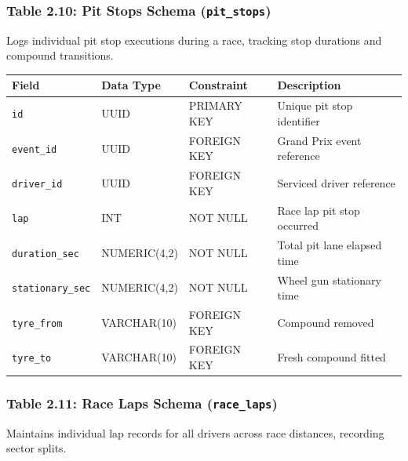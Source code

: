 \documentclass[12pt,a4paper]{report}
\begin{document}
\newpage
\subsubsection*{Table 2.10: Pit Stops Schema (\textnormal{\texttt{pit\_stops}})}
Logs individual pit stop executions during a race, tracking stop durations and compound transitions.

\begin{table}[H]
\centering
\small
\begin{tabularx}{\textwidth}{l p{2.6cm} p{2.6cm} X}
\toprule
\rowcolor{gray!15}
\textbf{Field} & \textbf{Data Type} & \textbf{Constraint} & \textbf{Description} \\
\midrule
\texttt{id} & UUID & PRIMARY KEY & Unique pit stop identifier \\
\texttt{event\_id} & UUID & FOREIGN KEY & Grand Prix event reference \\
\texttt{driver\_id} & UUID & FOREIGN KEY & Serviced driver reference \\
\texttt{lap} & INT & NOT NULL & Race lap pit stop occurred \\
\texttt{duration\_sec} & NUMERIC(4,2) & NOT NULL & Total pit lane elapsed time \\
\texttt{stationary\_sec} & NUMERIC(4,2) & NOT NULL & Wheel gun stationary time \\
\texttt{tyre\_from} & VARCHAR(10) & FOREIGN KEY & Compound removed \\
\texttt{tyre\_to} & VARCHAR(10) & FOREIGN KEY & Fresh compound fitted \\
\bottomrule
\end{tabularx}
\end{table}

\vspace{0.3cm}
\subsubsection*{Table 2.11: Race Laps Schema (\textnormal{\texttt{race\_laps}})}
Maintains individual lap records for all drivers across race distances, recording sector splits.
\end{document}
